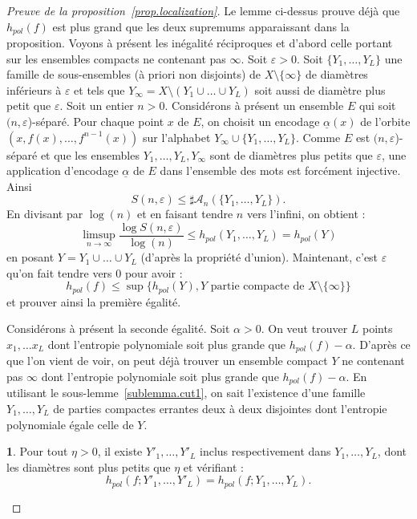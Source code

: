 \documentclass[11pt]{article}
\theoremstyle{definition}
\newcommand{\enoncename}{}
\newtheorem{corpusenonce}[theo]{\enoncename}
\newenvironment{enonce}[2][]{\renewcommand{\enoncename}{#2}\begin{corpusenonce}}{\end{corpusenonce}}
\numberwithin{equation}{section}
\numberwithin{figure}{section}
\numberwithin{table}{section}
\newcommand*\cA{{\mathcal A}}
\begin{document}
\begin{proof}[Preuve de la proposition~\ref{prop.localization}]
Le lemme ci-dessus prouve déjà que $h_{pol}(f)$ est plus grand que les deux supremums apparaissant dans la proposition. Voyons à présent les inégalité réciproques et d'abord celle portant sur les ensembles compacts ne contenant pas $\infty$. Soit $\varepsilon >0$. Soit $\{Y_1, \dots, Y_L\}$ une famille de sous-ensembles (à priori non disjoints) de $X \setminus \{\infty\}$ de diamètres inférieurs à $\varepsilon$ et tels que $Y_\infty = X \setminus (Y_1 \cup \dots \cup Y_L)$ soit aussi de diamètre plus petit que $\varepsilon$. Soit un entier $n >0$. Considérons à présent un ensemble $E$ qui soit $(n,\varepsilon$)-séparé. Pour chaque point $x$ de $E$, on choisit un encodage $\underline{\alpha}(x)$ de l'orbite $(x, f(x), \dots, f^{n-1}(x))$ sur l'alphabet $Y_\infty \cup \{Y_1, \dots, Y_L\}$. Comme $E$ est $(n,\varepsilon$)-séparé et que les ensembles $Y_1, \dots, Y_L, Y_\infty$ sont de diamètres plus petits que $\varepsilon$, une application d'encodage $\underline{\alpha}$ de $E$ dans l'ensemble des mots est forcément injective. Ainsi
\[
S(n,\varepsilon) \leq \sharp \cA_n(\{Y_1, \dots, Y_L\}).
\]
En divisant par $\log(n)$ et en faisant tendre $n$ vers l'infini, on obtient :
\[
\limsup_{n \to \infty} \frac{\log S(n,\varepsilon)}{\log (n)} \leq h_{pol}(Y_{1}, \dots, Y_{L}) = h_{pol}(Y)
\]
en posant $Y=Y_{1} \cup \dots \cup Y_{L}$ (d'après la propriété d'union). Maintenant, c'est $\varepsilon$ qu'on fait tendre vers $0$ pour avoir :
\[
h_{pol}(f) \leq \sup \{ h_{pol}(Y), Y \text{ partie compacte de } X\setminus \{\infty\} \}
\]
et prouver ainsi la première égalité.

Considérons à présent la seconde égalité. Soit $\alpha>0$. On veut trouver $L$ points $x_1, \dots x_L$ dont l'entropie polynomiale soit plus grande que $h_{pol}(f)-\alpha$. D'après ce que l'on vient de voir, on peut déjà trouver un ensemble compact $Y$ ne contenant pas $\infty$ dont l'entropie polynomiale soit plus grande que $h_{pol}(f)-\alpha$. En utilisant le sous-lemme~\ref{sublemma.cut1}, on sait l'existence d'une famille $Y_1, \dots, Y_L$ de parties compactes errantes deux à deux disjointes dont l'entropie polynomiale égale celle de $Y$.

\begin{enonce}{Sous-Lemme}\label{sublemma.cut2}
Pour tout $\eta>0$, il existe $Y'_1, \dots, Y'_L$ inclus respectivement dans $Y_1, \dots, Y_L$, dont les diamètres sont plus petits que $\eta$ et vérifiant :
\[
h_{pol}(f; Y'_{1}, \dots, Y'_{L})= h_{pol}(f; Y_{1}, \dots, Y_{L}).
\]
\end{enonce}


\end{proof}
\end{document}
